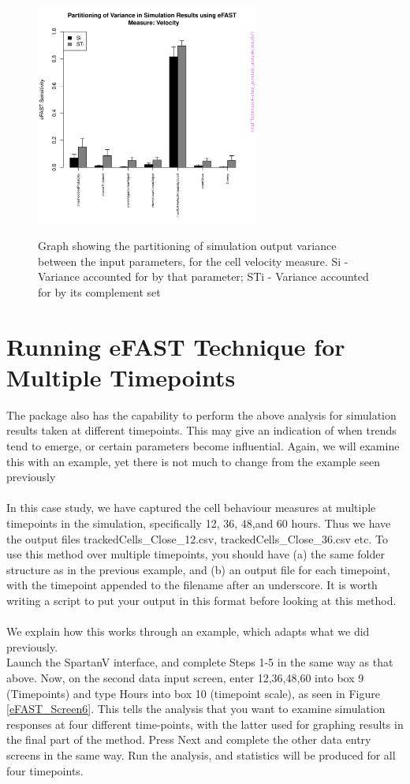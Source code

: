 \documentclass[a4paper,11pt]{article}
\begin{document}
\begin{figure}[h!]
\centering
    \includegraphics[width=0.65\textwidth]{eFAST_Velocity.pdf}\\ \noindent
    \caption{Graph showing the partitioning of simulation output variance between the input parameters, for the cell velocity measure. Si - Variance accounted for by that parameter; STi - Variance accounted for by its complement set}
    \label{eFAST_Results2}
\end{figure}


\section{Running eFAST Technique for Multiple Timepoints}
\noindent The package also has the capability to perform the above analysis for simulation results taken at different timepoints. This may give an indication of when trends tend to emerge, or certain parameters become influential. Again, we will examine this with an example, yet there is not much to change from the example seen previously\\
\\
In this case study, we have captured the cell behaviour measures at multiple timepoints in the simulation, specifically 12, 36, 48,and 60 hours.  Thus we have the output files trackedCells\_Close\_12.csv, trackedCells\_Close\_36.csv etc. To use this method over multiple timepoints, you should have (a) the same folder structure as in the previous example, and (b) an output file for each timepoint, with the timepoint appended to the filename after an underscore. It is worth writing a script to put your output in this format before looking at this method.\\
\\
We explain how this works through an example, which adapts what we did previously.
\\
Launch the SpartanV interface, and complete Steps 1-5 in the same way as that above. Now, on the second data input screen, enter 12,36,48,60 into box 9 (Timepoints) and type Hours into box 10 (timepoint scale), as seen in Figure \ref{eFAST_Screen6}. This tells the analysis that you want to examine simulation responses at four different time-points, with the latter used for graphing results in the final part of the method. Press Next and complete the other data entry screens in the same way. Run the analysis, and statistics will be produced for all four timepoints. 
\end{document}

